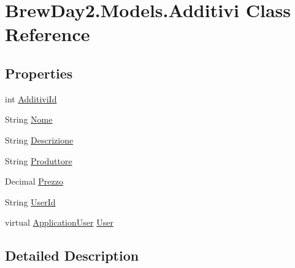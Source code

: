 \hypertarget{class_brew_day2_1_1_models_1_1_additivi}{}\section{Brew\+Day2.\+Models.\+Additivi Class Reference}
\label{class_brew_day2_1_1_models_1_1_additivi}
\subsection*{Properties}
\begin{DoxyCompactItemize}
\item 
int \mbox{\hyperlink{class_brew_day2_1_1_models_1_1_additivi_aa979b73f1edfb1d8b9a60a87d08b6280}{Additivi\+Id}}
\item 
String \mbox{\hyperlink{class_brew_day2_1_1_models_1_1_additivi_a2d1e5da970ab162a5f2fb91294a6ebc3}{Nome}}
\item 
String \mbox{\hyperlink{class_brew_day2_1_1_models_1_1_additivi_a99a320bb3906eb8d0001a458ab54f03a}{Descrizione}}
\item 
String \mbox{\hyperlink{class_brew_day2_1_1_models_1_1_additivi_aa46d7f6254208fa08b91b315b8fec4b7}{Produttore}}
\item 
Decimal \mbox{\hyperlink{class_brew_day2_1_1_models_1_1_additivi_a85cfbc34630af4aed2d588c494ebf3e7}{Prezzo}}
\item 
String \mbox{\hyperlink{class_brew_day2_1_1_models_1_1_additivi_a55604f814455b3f8a1fbc83829e353f0}{User\+Id}}
\item 
virtual \mbox{\hyperlink{class_brew_day2_1_1_models_1_1_application_user}{Application\+User}} \mbox{\hyperlink{class_brew_day2_1_1_models_1_1_additivi_a3c8a85b0adf2a03f9d22121f6255cf2d}{User}}
\end{DoxyCompactItemize}


\subsection{Detailed Description}


